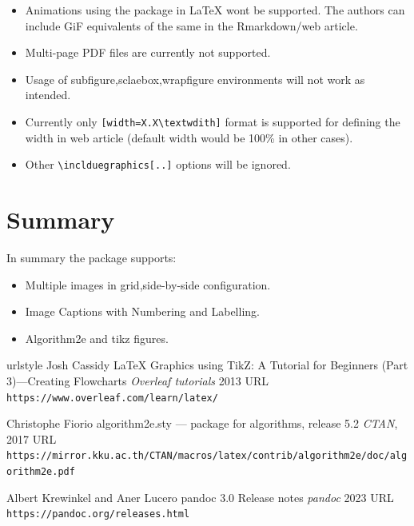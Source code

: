 \begin{itemize}
\item Animations using the  package in LaTeX wont be supported. The authors
can include GiF equivalents of the same in the Rmarkdown/web article.
\item Multi-page PDF files are currently not supported.
\item Usage of subfigure,sclaebox,wrapfigure environments will not work as intended.
\item Currently only \verb|[width=X.X\textwdith]| format is supported for defining the width
in web article (default width would be 100\% in other cases).
\item Other \verb|\inclduegraphics[..]| options will be ignored.
\end{itemize}



\section{Summary}

In summary the  package supports:

\begin{itemize}
\item Multiple images in grid,side-by-side configuration.
\item Image Captions with Numbering and Labelling.
\item Algorithm2e and tikz figures.
\end{itemize}




\begin{thebibliography}{4}
    \providecommand{\natexlab}[1]{#1}
    \providecommand{\url}[1]{\texttt{#1}}
    \expandafter\ifx\csname urlstyle\endcsname\relax
      \providecommand{\doi}[1]{doi: #1}\else
      \providecommand{\doi}{doi: \begingroup \urlstyle{rm}\Url}\fi
{}
Josh Cassidy
\newblock LaTeX Graphics using TikZ: A Tutorial for Beginners (Part 3)—Creating Flowcharts
\newblock \emph{Overleaf tutorials}  2013
\newblock URL \url{https://www.overleaf.com/learn/latex/}

Christophe Fiorio
\newblock algorithm2e.sty — package for algorithms, release 5.2
\newblock \emph{CTAN}, 2017
\newblock URL \url{https://mirror.kku.ac.th/CTAN/macros/latex/contrib/algorithm2e/doc/algorithm2e.pdf}

Albert Krewinkel and Aner Lucero
\newblock pandoc 3.0 Release notes
\newblock \emph{pandoc}  2023
\newblock URL \url{https://pandoc.org/releases.html}

\end{thebibliography}


\address{%
Abhishek Ulayil\\
Student, Institute of Actuaries of India\\%
Mumbai, India\\
ORCiD: 0009-0000-6935-8690\\
}
